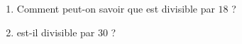 
\begin{enumerate}
\item Comment peut-on savoir que  est divisible par $18$ ?
\item {} est-il divisible par $30$ ?
\end{enumerate}